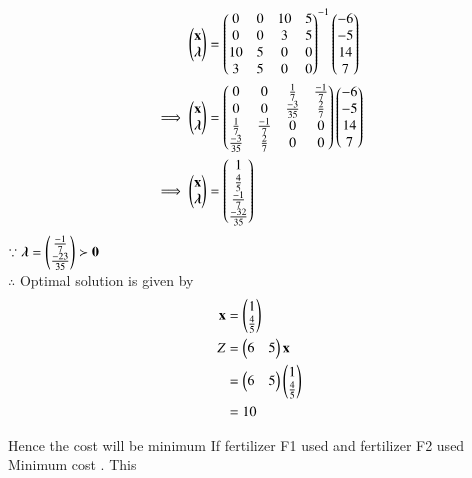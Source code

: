\documentclass[journal,12pt,twocolumn]{IEEEtran}
\begin{document}
\begin{align}
    \begin{pmatrix}\mathbf{x} \\ \boldsymbol{\lambda}\end{pmatrix} &= \begin{pmatrix}0 & 0 & 10 & 5 \\ 0 & 0 & 3 & 5 \\ 10 & 5 & 0 & 0 \\ 3 & 5 & 0 & 0\end{pmatrix}^{-1}\begin{pmatrix}-6 \\ -5 \\ 14 \\ 7\end{pmatrix}
    \\
    \implies   \begin{pmatrix}\mathbf{x} \\ \boldsymbol{\lambda}\end{pmatrix} &= \begin{pmatrix}0 & 0 & \frac{1}{7} & \frac{-1}{7} \\ 0 & 0 & \frac{-3}{35} & \frac{2}{7} \\ \frac{1}{7} & \frac{-1}{7} & 0 & 0 \\ \frac{-3}{35} & \frac{2}{7} & 0 & 0\end{pmatrix}\begin{pmatrix}-6 \\ -5 \\ 14 \\ 7\end{pmatrix}
    \\
    \implies \begin{pmatrix}\mathbf{x} \\ \boldsymbol{\lambda}\end{pmatrix} &= \begin{pmatrix}1 \\ \frac{4}{5} \\ \frac{-1}{7} \\ \frac{-32}{35} \end{pmatrix}
\end{align}
$\because \boldsymbol{\lambda}=\begin{pmatrix}\frac{-1}{7} \\ \frac{-23}{35}\end{pmatrix} \succ \mathbf{0} $ 
\\
$\therefore$ Optimal solution is given by
\begin{align}
    \mathbf{x} &= \begin{pmatrix}1\\\frac{4}{5}\end{pmatrix} \\
    Z &= \begin{pmatrix}6 & 5\end{pmatrix}\mathbf{x} \\
    &= \begin{pmatrix}6 & 5\end{pmatrix}\begin{pmatrix}1 \\\frac{4}{5} \end{pmatrix} \\
    &= 10
\end{align}

Hence the cost will be minimum If fertilizer F1 used   and fertilizer F2 used   \\ Minimum cost   .  This
\end{document}
